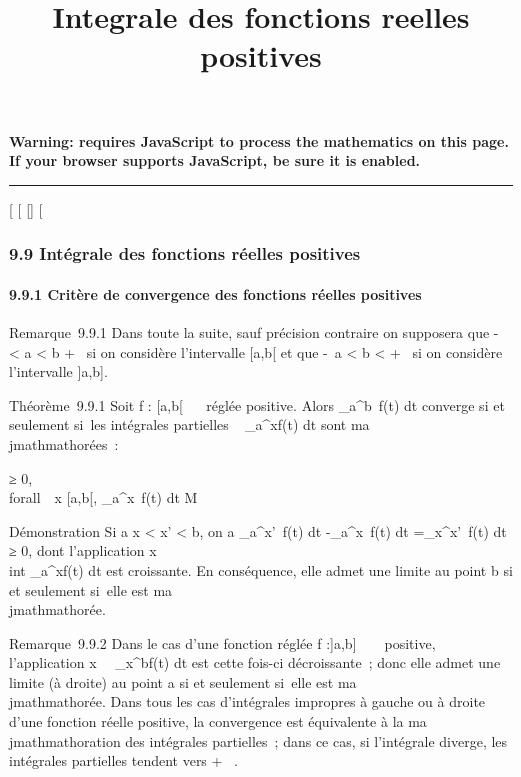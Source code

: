 \documentclass[]{article}
\title{Integrale des fonctions reelles positives}
\author{}
\date{}
\begin{document}
\maketitle

\textbf{Warning: 
requires JavaScript to process the mathematics on this page.\\ If your
browser supports JavaScript, be sure it is enabled.}

\begin{center}\rule{3in}{0.4pt}\end{center}

{[}
{[}
{[}{]}
{[}

\subsubsection{9.9 Intégrale des fonctions réelles positives}

\paragraph{9.9.1 Critère de convergence des fonctions réelles positives}

Remarque~9.9.1 Dans toute la suite, sauf précision contraire on
supposera que -\infty~ \textless{} a \textless{} b \leq +\infty~ si on considère
l'intervalle {[}a,b{[} et que -\infty~\leq a \textless{} b \textless{} +\infty~ si on
considère l'intervalle {]}a,b{]}.

Théorème~9.9.1 Soit f : {[}a,b{[}\rightarrow~ ~ réglée positive. Alors
\int  _a^b~f(t) dt converge si et
seulement si~les intégrales partielles \int ~
_a^xf(t) dt sont ma\\jmathmathorées~:

\existsM ≥ 0, \\forall~~x \in
{[}a,b{[}, \int  _a^x~f(t) dt \leq M

Démonstration Si a \leq x \textless{} x' \textless{} b, on a
\int  _a^x'~f(t) dt
-\int  _a^x~f(t) dt
=\int  _x^x'~f(t) dt ≥ 0, dont
l'application x\mapsto~\\int
 _a^xf(t) dt est croissante. En conséquence, elle admet
une limite au point b si et seulement si~elle est ma\\jmathmathorée.

Remarque~9.9.2 Dans le cas d'une fonction réglée f :{]}a,b{]} \rightarrow~ ~
positive, l'application
x\mapsto~\int ~
_x^bf(t) dt est cette fois-ci décroissante~; donc elle
admet une limite (à droite) au point a si et seulement si~elle est
ma\\jmathmathorée. Dans tous les cas d'intégrales impropres à gauche ou à droite
d'une fonction réelle positive, la convergence est équivalente à la
ma\\jmathmathoration des intégrales partielles~; dans ce cas, si l'intégrale
diverge, les intégrales partielles tendent vers + \infty~.
\end{document}
